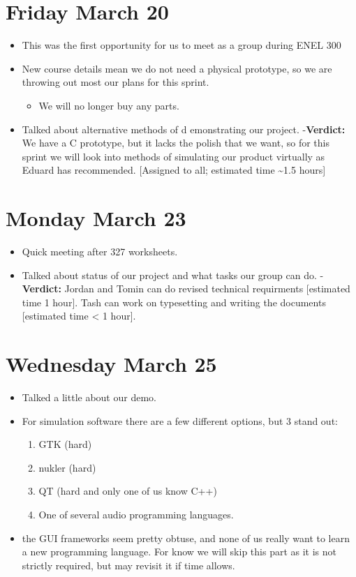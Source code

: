 \documentclass[11pt]{article}
\begin{document}
\section*{Friday March 20}
\label{sec:org8fd7197}
\begin{itemize}
\item This was the first opportunity for us to meet as a group during ENEL 300
\item New course details mean we do not need a physical prototype, so we are throwing out most our plans for this sprint.
\begin{itemize}
\item We will no longer buy any parts.
\end{itemize}
\item Talked about alternative methods of d emonstrating our project.
-\textbf{Verdict:} We have a C prototype, but it lacks the polish that
we want, so for this sprint we will look into methods of simulating
our product virtually as Eduard has recommended. [Assigned to
all; estimated time \textasciitilde{}1.5 hours]
\end{itemize}
\section*{Monday March 23}
\label{sec:org36abb51}
\begin{itemize}
\item Quick meeting after 327 worksheets.
\item Talked about status of our project and what tasks our group can do.
-\textbf{Verdict:} Jordan and Tomin can do revised technical requirments [estimated time 1 hour]. Tash
can work on typesetting and writing the documents [estimated time < 1 hour].
\end{itemize}
\section*{Wednesday March 25}
\label{sec:orgc7e3cd3}
\begin{itemize}
\item Talked a little about our demo.
\item For simulation software there are a few different options, but 3 stand out:
\begin{enumerate}
\item GTK (hard)
\item nukler (hard)
\item QT (hard and only one of us know C++)
\item One of several audio programming languages.
\end{enumerate}
\item the GUI frameworks seem pretty obtuse, and none of us really want to learn a new
programming language. For know we will skip this part as it is not strictly required,
but may revisit it if time allows.
\end{itemize}
\end{document}
